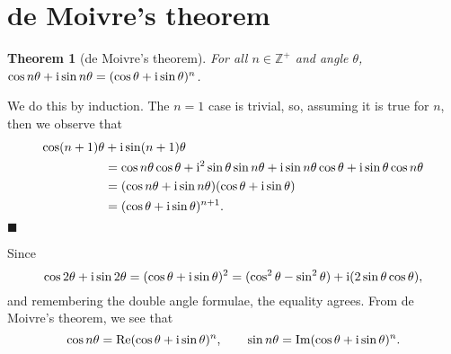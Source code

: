 \documentclass[letter-paper]{tufte-book}
\newtheorem{theorem}{\color{pastel-blue}Theorem}[section]
\newenvironment{proof}[1][Proof]{\begin{trivlist}
\item[\hskip \labelsep {\bfseries #1}]}{\end{trivlist}}
\newenvironment{example}[1][Example]{\begin{trivlist}
\item[\hskip \labelsep {\bfseries #1}]}{\end{trivlist}}
\newcommand{\zi}{{\rm i}}
\newcommand\Real{\mbox{Re}} %
\newcommand\Imag{\mbox{Im}} %
\newcommand{\qed}{\hfill$\blacksquare$}
\begin{document}
\section{de Moivre's theorem}

\begin{theorem}[de Moivre's theorem]
	For all $n\in\mathbb{Z}^+$ and angle $\theta$, $\cos n\theta+\zi \sin
	n\theta = (\cos\theta+\zi\sin\theta)^n$.
\end{theorem}
\begin{proof}
	We do this by induction. The $n=1$ case is trivial, so, assuming it is true
	for $n$, then we observe that
	\begin{align*}
		\cos(n+1)\theta&+\zi\sin(n+1)\theta \\
		&=\cos n\theta\cos\theta + \zi^2 \sin\theta\sin n\theta
		+\zi\sin n\theta\cos\theta + \zi\sin\theta\cos n\theta\\
		&= (\cos n\theta+\zi\sin n\theta)(\cos\theta+\zi\sin\theta)\\
		&=(\cos\theta+\zi\sin\theta)^{n+1}.
	\end{align*}
	\qed
\end{proof}

\begin{example}
  Since  
	\begin{equation*}
		\cos2\theta+\zi\sin2\theta=(\cos\theta+\zi\sin\theta)^2
		=(\cos^2\theta-\sin^2\theta)+\zi(2\sin\theta\cos\theta),
	\end{equation*}
	and remembering the double angle formulae, the equality agrees. From de
	Moivre's theorem, we see that
	\begin{equation*}
		\cos n\theta=\Real(\cos\theta+\zi\sin\theta)^n,\qquad
		\sin n\theta=\Imag(\cos\theta+\zi\sin\theta)^n.
	\end{equation*}
\end{example}
\end{document}
